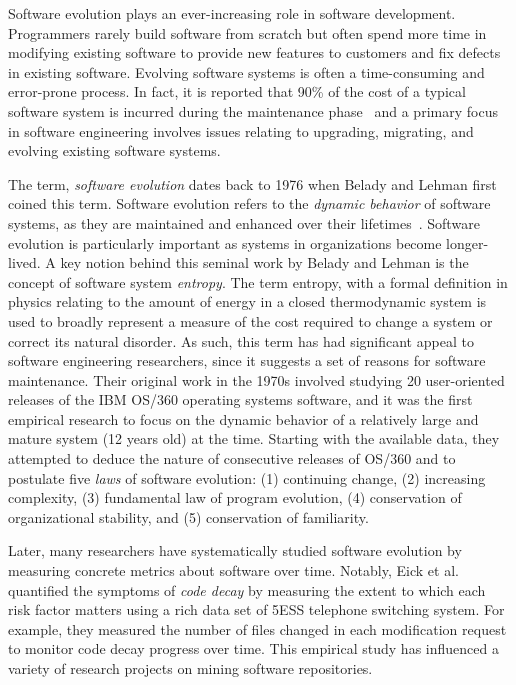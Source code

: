 Software evolution plays an ever-increasing role in software development. Programmers rarely build software from scratch but often spend more time in modifying existing software to provide new features to customers and fix defects in existing software.  Evolving software systems is often a time-consuming and error-prone process. In fact, it is reported that 90\% of the cost of a typical software system is incurred during the maintenance phase~\cite{Madhavji2006:evolution} and a primary focus in software engineering involves issues relating to upgrading, migrating, and evolving existing software systems. 

The term, {\em software evolution} dates back to 1976 when Belady and Lehman first coined this term. Software evolution refers to the {\em dynamic behavior} of software systems, as they are maintained and enhanced over their lifetimes~\cite{Belady1976:ModelEvolution}. Software evolution is particularly important as systems in organizations become longer-lived. %
A key notion behind this seminal work by Belady and Lehman is the concept of software system {\em entropy}. The term entropy, with a formal definition in physics relating to the amount of energy in a closed thermodynamic system is used to broadly represent a measure of the cost required to change a system or correct its natural disorder. As such, this term has had significant appeal to software engineering researchers, since it suggests a set of reasons for software maintenance. Their original work in the 1970s involved studying 20 user-oriented releases of the IBM OS/360 operating systems software, and it was the first empirical research to focus on the dynamic behavior of a relatively large and mature system (12 years old) at the time. Starting with the available data, they attempted to deduce the nature of consecutive releases of OS/360 and to postulate five {\em laws} of software evolution: (1) continuing change, (2) increasing complexity, (3) fundamental law of program evolution, (4) conservation of organizational stability, and (5) conservation of familiarity. 

Later, many researchers have systematically studied software evolution by measuring concrete metrics about software over time. 
Notably, Eick et al.\cite{Eick2001:CodeDecay} quantified the symptoms of {\em code decay} by measuring the extent to which each risk factor matters using a rich data set of 5ESS telephone switching system. For example, they measured the number of files changed in each modification request to monitor code decay progress over time. This empirical study has influenced a variety of research projects on mining software repositories.  %

